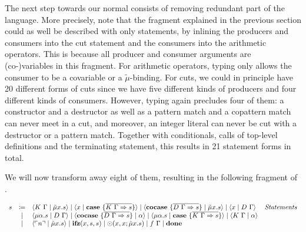 The next step towards our normal consists of removing redundant part of the language.
More precisely, note that the fragment \targetvar{} explained in the previous section could as well be described with only statements, by inlining the producers and consumers into the cut statement and the consumers into the arithmetic operators.
This is because all producer and consumer arguments are (co-)variables in this fragment.
For arithmetic operators, typing only allows the consumer to be a covariable or a $\tilde\mu$-binding.
For cuts, we could in principle have 20 different forms of cuts since we have five different kinds of producers and four different kinds of consumers.
However, typing again precludes four of them: a constructor and a destructor as well as a pattern match and a copattern match can never meet in a cut, and moreover, an integer literal can never be cut with a destructor or a pattern match.
Together with conditionals, calls of top-level definitions and the terminating statement, this results in 21 statement forms in total.

We will now transform away eight of them, resulting in the following fragment \targetred{} of \targetlang{}.

\begin{definition}
  \[
    \begin{array}{rcll}
      s & \coloneqq & \langle K\ \Gamma \mid \tilde{\mu}x.s \rangle \mid \langle x \mid \mathbf{case}\ \{ \overline{K\ \Gamma \Rightarrow s} \} \rangle \mid \langle \mathbf{cocase}\ \{ \overline{D\ \Gamma \Rightarrow s} \} \mid \tilde{\mu}x.s \rangle \mid \langle x \mid D\ \Gamma \rangle & \emph{Statements}\\
       & \mid & \langle \mu\alpha.s \mid D\ \Gamma \rangle \mid \langle \mathbf{cocase}\ \{ \overline{D\ \Gamma \Rightarrow s} \} \mid \alpha \rangle \mid \langle \mu\alpha.s \mid \mathbf{case}\ \{ \overline{K\ \Gamma \Rightarrow s} \} \rangle \mid \langle K\ \Gamma \mid \alpha \rangle & \\
       & \mid & \langle \ulcorner n \urcorner \mid \tilde{\mu}x.s \rangle \mid \mathbf{ifz}(x, s, s) \mid \odot(x, x; \tilde{\mu}x.s) \mid f\ \Gamma \mid \mathbf{done} & \\
    \end{array}
  \]
\end{definition}

